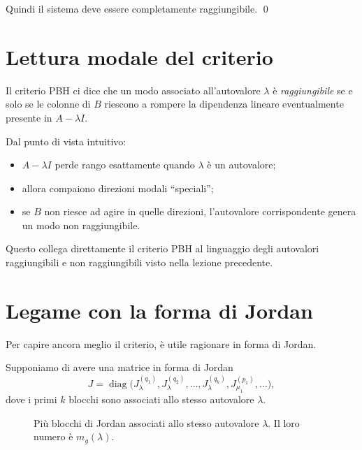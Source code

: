 Quindi il sistema deve essere completamente raggiungibile.
\qed

\section{Lettura modale del criterio}

Il criterio PBH ci dice che un modo associato all’autovalore \(\lambda\) è \emph{raggiungibile} se e solo se le colonne di \(B\) riescono a rompere la dipendenza lineare eventualmente presente in \(A-\lambda I\).

Dal punto di vista intuitivo:
\begin{itemize}
    \item \(A-\lambda I\) perde rango esattamente quando \(\lambda\) è un autovalore;
    \item allora compaiono direzioni modali “speciali”;
    \item se \(B\) non riesce ad agire in quelle direzioni, l’autovalore corrispondente genera un modo non raggiungibile.
\end{itemize}

Questo collega direttamente il criterio PBH al linguaggio degli autovalori raggiungibili e non raggiungibili visto nella lezione precedente.

\section{Legame con la forma di Jordan}

Per capire ancora meglio il criterio, è utile ragionare in forma di Jordan.

Supponiamo di avere una matrice in forma di Jordan
\[
J=\operatorname{diag}\!\bigl(
J_{\lambda}^{(q_1)},
J_{\lambda}^{(q_2)},
\dots,
J_{\lambda}^{(q_k)},
J_{\mu_1}^{(p_1)},
\dots
\bigr),
\]
dove i primi \(k\) blocchi sono associati allo stesso autovalore \(\lambda\).

\begin{figure}[H]
\centering
{}
\caption{Più blocchi di Jordan associati allo stesso autovalore \(\lambda\). Il loro numero è \(m_g(\lambda)\).}
\end{figure}

